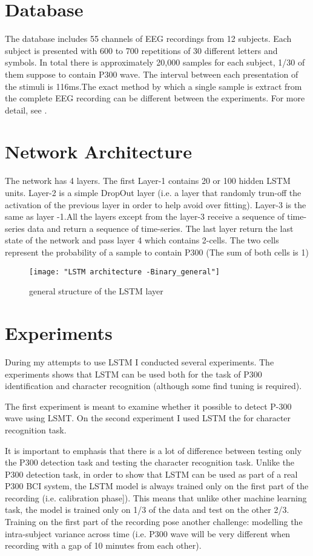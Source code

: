 \documentclass[]{report}
\begin{document}
\section{Database}


The database includes 55 channels of EEG recordings from 12 subjects. Each subject is presented with 600 to 700 repetitions of 30 different letters and symbols. In total there is approximately 20,000 samples for each subject, 1/30 of them suppose to contain P300 wave. The interval between each presentation of the stimuli is 116ms.The exact method by which a single sample is extract from the complete EEG recording can be different between the experiments. For more detail, see \cite{Blankertz}.


\section{Network Architecture} \label{netarch}
The network has 4 layers. The first Layer-1 contains 20 or 100 hidden LSTM units. Layer-2 is a simple DropOut layer (i.e. a layer that randomly trun-off the activation of the previous layer in order to help avoid over fitting). Layer-3 is the same as layer -1.All the layers except from the layer-3 receive a sequence of time-series data and return a sequence of time-series. The last layer return the last state of the network and pass layer 4 which contains 2-cells. The two cells represent the probability of a sample to contain P300 (The sum of both cells is 1)

\begin{figure*}[h]
	\texttt{[image: "LSTM architecture -Binary\_general"]}
	\caption{general structure of the LSTM layer}
	\label{fig:RSVP}
\end{figure*}



\section{Experiments}

During my attempts to use LSTM I conducted several experiments. The experiments shows that LSTM can be used both for the task of P300 identification and character recognition (although some find tuning is required). 

The first experiment is meant to examine whether it possible to detect P-300 wave using LSMT. On the second experiment I used LSTM the for character recognition task.

It is important to emphasis that there is a lot of difference between testing only the P300 detection task and testing the character recognition task. Unlike the P300 detection task, in order to show that LSTM can be used as part of a real P300 BCI system, the LSTM model is always trained only on the first part of the recording (i.e. \cite{Blankertz} calibration phase]). This means that unlike other machine learning task, the model is trained only on 1/3 of the data and test on the other 2/3. Training on the first part of the recording pose another challenge: modelling the intra-subject variance across time (i.e. P300 wave will be very different when recording with a gap of 10 minutes from each other).
\end{document}
